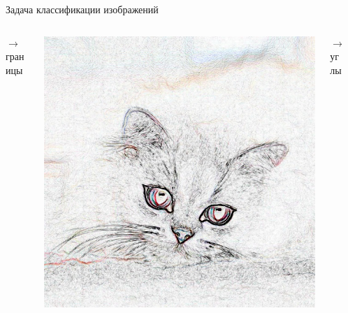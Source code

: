 \documentclass[aspectratio=169]{beamer}
\begin{document}
\begin{frame}{Задача классификации изображений}
\begin{columns}
\begin{column}{.15\linewidth}
            \( \longrightarrow \) \\
            границы
        \end{column}
        \begin{column}{.25\linewidth}
            \includegraphics[width=\linewidth]{graphs/fig12_1.jpg}
        \end{column}
        \pause{}
        \begin{column}{.15\linewidth}
            \centering
            \( \longrightarrow \) \\
            углы
        \end{column}
        \begin{column}{.07\linewidth}

\end{column}
\end{columns}
\end{frame}
\end{document}
